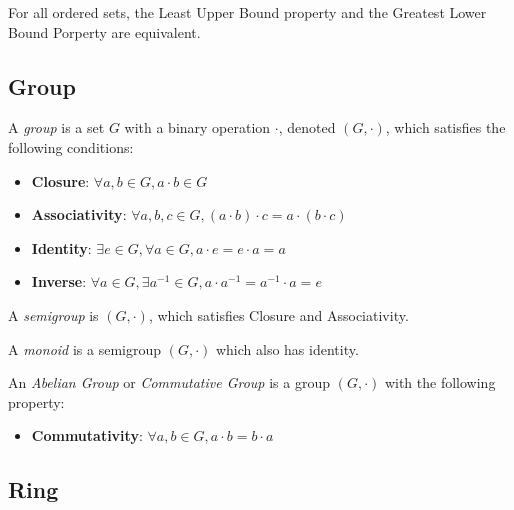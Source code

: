\documentclass{report}
\begin{document}
		\begin{coro} \label{coro_glb_lub_property_equiv}
			For all ordered sets, the Least Upper Bound property and the Greatest Lower Bound Porperty are equivalent.
		\end{coro}

		\subsection{Group}

			\begin{defn}[Group] \label{def_group}
				A \emph{group} is a set $G$ with a binary operation $\cdot$, denoted $(G,\cdot)$, which satisfies the following conditions:
				\begin{itemize}
					\item \textbf{Closure}: $\forall a,b \in G, a \cdot b \in G$
					\item \textbf{Associativity}: $\forall a,b,c \in G, (a \cdot b) \cdot c=a \cdot (b \cdot c)$
					\item \textbf{Identity}: $\exists e \in G, \forall a \in G, a \cdot e=e \cdot a=a$
					\item \textbf{Inverse}: $\forall a \in G, \exists a^{-1} \in G, a \cdot a^{-1}=a^{-1} \cdot a=e$
				\end{itemize}
			\end{defn}

		\begin{defn}[Semigroup] \label{def_semigroup}
			A \emph{semigroup} is $(G,\cdot)$, which satisfies Closure and Associativity.
		\end{defn}

		\begin{defn}[Monoid] \label{def_monoid}
			A \emph{monoid} is a semigroup $(G,\cdot)$ which also has identity.
		\end{defn}

		\begin{defn} \label{def_abelian_group}
			An \emph{Abelian Group} or \emph{Commutative Group} is a group $(G,\cdot)$ with the following property:
			\begin{itemize}
				\item \textbf{Commutativity}: $\forall a,b \in G, a \cdot b=b \cdot a$
			\end{itemize}
		\end{defn}

		\subsection{Ring}
\end{document}
